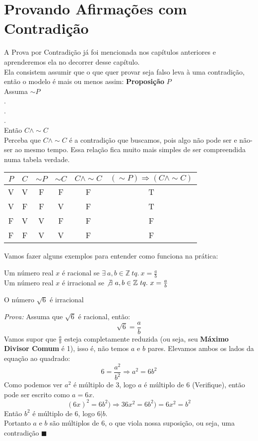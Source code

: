 \documentclass[main.tex]{subfiles}
\begin{document}
\section{Provando Afirmações com Contradição}
A Prova por Contradição já foi mencionada nos capítulos anteriores e aprenderemos ela no decorrer desse capítulo.\\
Ela consistem assumir que o que quer provar seja falso leva à uma contradição, então o modelo é mais ou menos assim:
\textbf{Proposição }$P$\\
Assuma $\sim P$ \\
. \\
. \\
. \\
Então $C \land \sim C$
\\
Perceba que $C \land \sim C$ é a contradição que buscamos, pois algo não pode ser e não-ser ao mesmo tempo. Essa relação fica muito mais simples de ser compreendida numa tabela verdade. \\
\begin{center}
\begin{tabular}{|c | c || c | c | c || c |} \hline
$P$  & $C$ & $\sim P$ & $\sim C$ & $C \land \sim C$ & $(\sim P) \Rightarrow (C \land \sim C)$  \\ \hline 
V    &  V  &  F       &  F       &   F              &         T   \\
V    &  F  & F        &  V       &  F               &         T \\
F    &   V & V        &F         &  F               &       F \\
F    & F   & V        & V        & F                & F    \\ \hline 
\end{tabular}
\end{center}
Vamos fazer alguns exemplos para entender como funciona na prática:

\begin{definition}
Um número real $x$ é racional se $\exists \ a,b \in \mathbb{Z} \ tq. \ x = \frac{a}{b}$\\
Um número real $x$ é irracional se $\not\exists \ a,b \in \mathbb{Z} \ tq. \ x = \frac{a}{b}$
\end{definition}
\begin{proposition}
O número $\sqrt{6}$ é irracional
\end{proposition}
\textit{Prova:} Assuma que $\sqrt{6}$ é racional, então: 
$$\sqrt{6} = \frac{a}{b}$$
Vamos supor que $\frac{a}{b}$ esteja completamente reduzida (ou seja, seu \textbf{Máximo Divisor Comum} é 1), isso é, não temos $a$ e $b$ pares. Elevamos ambos os lados da equação ao quadrado:
$$6 = \frac{a^2}{b^2} \Rightarrow a^2 = 6b^2$$
Como podemos ver $a^2$ é múltiplo de 3, logo $a$ é múltiplo de 6 (Verifique), então pode ser escrito como $a = 6x$. \\
$$(6x)^2 = 6b^2) \Rightarrow 36x^2 = 6b^2) = 6x^2 = b^2$$
Então $b^2$ é múltiplo de $6$, logo $6 | b$. \\
Portanto $a$ e $b$ são múltiplos de $6$, o que viola nossa suposição, ou seja, uma contradição $\blacksquare$
\end{document}
